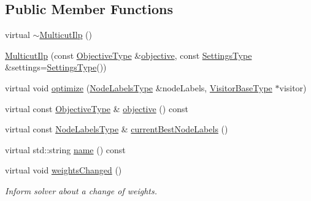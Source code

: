 \subsection*{Public Member Functions}
\begin{DoxyCompactItemize}
\item 
virtual \hyperlink{classnifty_1_1graph_1_1opt_1_1multicut_1_1MulticutIlp_a82ada1b4fa2d00331e7d5d7fb7e6e910}{$\sim$\+Multicut\+Ilp} ()
\item 
\hyperlink{classnifty_1_1graph_1_1opt_1_1multicut_1_1MulticutIlp_ac93adc7fbfdafdee8c2ff27cf2b31656}{Multicut\+Ilp} (const \hyperlink{classnifty_1_1graph_1_1opt_1_1multicut_1_1MulticutIlp_acd5485d2d20d1e89c5202fc677993d5a}{Objective\+Type} \&\hyperlink{classnifty_1_1graph_1_1opt_1_1multicut_1_1MulticutIlp_abe5109360a67abc282f952761f7f9558}{objective}, const \hyperlink{structnifty_1_1graph_1_1opt_1_1multicut_1_1MulticutIlp_1_1SettingsType}{Settings\+Type} \&settings=\hyperlink{structnifty_1_1graph_1_1opt_1_1multicut_1_1MulticutIlp_1_1SettingsType}{Settings\+Type}())
\item 
virtual void \hyperlink{classnifty_1_1graph_1_1opt_1_1multicut_1_1MulticutIlp_a6178a80dc1ce1729ced4adf6917f676d}{optimize} (\hyperlink{classnifty_1_1graph_1_1opt_1_1multicut_1_1MulticutIlp_a0e1396c7332495a1d4af41e5df69398b}{Node\+Labels\+Type} \&node\+Labels, \hyperlink{classnifty_1_1graph_1_1opt_1_1multicut_1_1MulticutIlp_a0fccd157c0176cba9c08f877b3798437}{Visitor\+Base\+Type} $\ast$visitor)
\item 
virtual const \hyperlink{classnifty_1_1graph_1_1opt_1_1multicut_1_1MulticutIlp_acd5485d2d20d1e89c5202fc677993d5a}{Objective\+Type} \& \hyperlink{classnifty_1_1graph_1_1opt_1_1multicut_1_1MulticutIlp_abe5109360a67abc282f952761f7f9558}{objective} () const
\item 
virtual const \hyperlink{classnifty_1_1graph_1_1opt_1_1multicut_1_1MulticutIlp_a0e1396c7332495a1d4af41e5df69398b}{Node\+Labels\+Type} \& \hyperlink{classnifty_1_1graph_1_1opt_1_1multicut_1_1MulticutIlp_a6851390d398b64c24315e60803aee297}{current\+Best\+Node\+Labels} ()
\item 
virtual std\+::string \hyperlink{classnifty_1_1graph_1_1opt_1_1multicut_1_1MulticutIlp_ae16cee89b02c93b4d2af91f39411411e}{name} () const
\item 
virtual void \hyperlink{classnifty_1_1graph_1_1opt_1_1multicut_1_1MulticutIlp_a532d846fdb2feecb240373e87fec82a4}{weights\+Changed} ()
\begin{DoxyCompactList}\small\item\em Inform solver about a change of weights. \end{DoxyCompactList}\end{DoxyCompactItemize}



